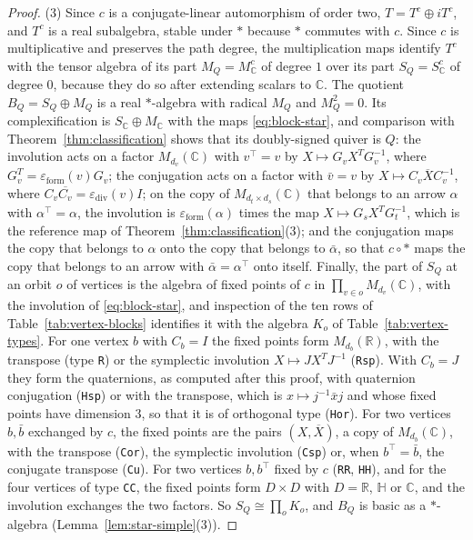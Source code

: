\documentclass[12pt, a4paper]{report}
\theoremstyle{plain}
\theoremstyle{definition}
\theoremstyle{remark}
\theoremstyle{plain}
\newcommand{\epsilondiv}{\varepsilon_{\mathrm{div}}}
\newcommand{\epsilonform}{\varepsilon_{\mathrm{form}}}
\newcommand{\RR}{\mathbb{R}}
\newcommand{\CC}{\mathbb{C}}
\newcommand{\HH}{\mathbb{H}}
\begin{document}
\begin{proof}
(3) Since $c$ is a conjugate-linear automorphism of order two, $T=T^c\oplus iT^c$, and $T^c$ is a real subalgebra, stable under $*$ because $*$ commutes with $c$. Since $c$ is multiplicative and preserves the path degree, the multiplication maps identify $T^c$ with the tensor algebra of its part $M_Q=M_\CC^c$ of degree $1$ over its part $S_Q=S_\CC^c$ of degree $0$, because they do so after extending scalars to $\CC$. The quotient $B_Q=S_Q\oplus M_Q$ is a real $*$-algebra with radical $M_Q$ and $M_Q^2=0$. Its complexification is $S_\CC\oplus M_\CC$ with the maps \eqref{eq:block-star}, and comparison with Theorem~\ref{thm:classification} shows that its doubly-signed quiver is $Q$: the involution acts on a factor $M_{d_v}(\CC)$ with $v^{\top}=v$ by $X\mapsto G_vX^TG_v^{-1}$, where $G_v^T=\epsilonform(v)G_v$; the conjugation acts on a factor with $\bar v=v$ by $X\mapsto C_v\overline XC_v^{-1}$, where $C_v\overline{C_v}=\epsilondiv(v)I$; on the copy of $M_{d_t\times d_s}(\CC)$ that belongs to an arrow $\alpha$ with $\alpha^{\top}=\alpha$, the involution is $\epsilonform(\alpha)$ times the map $X\mapsto G_sX^TG_t^{-1}$, which is the reference map of Theorem~\ref{thm:classification}(3); and the conjugation maps the copy that belongs to $\alpha$ onto the copy that belongs to $\bar\alpha$, so that $c\circ*$ maps the copy that belongs to an arrow with $\bar\alpha=\alpha^{\top}$ onto itself. Finally, the part of $S_Q$ at an orbit $o$ of vertices is the algebra of fixed points of $c$ in $\prod_{v\in o}M_{d_v}(\CC)$, with the involution of \eqref{eq:block-star}, and inspection of the ten rows of Table~\ref{tab:vertex-blocks} identifies it with the algebra $K_o$ of Table~\ref{tab:vertex-types}. For one vertex $b$ with $C_b=I$ the fixed points form $M_{d_b}(\RR)$, with the transpose (type \texttt{R}) or the symplectic involution $X\mapsto JX^TJ^{-1}$ (\texttt{Rsp}). With $C_b=J$ they form the quaternions, as computed after this proof, with quaternion conjugation (\texttt{Hsp}) or with the transpose, which is $x\mapsto j^{-1}\bar xj$ and whose fixed points have dimension $3$, so that it is of orthogonal type (\texttt{Hor}). For two vertices $b,\bar b$ exchanged by $c$, the fixed points are the pairs $(X,\overline X)$, a copy of $M_{d_b}(\CC)$, with the transpose (\texttt{Cor}), the symplectic involution (\texttt{Csp}) or, when $b^{\top}=\bar b$, the conjugate transpose (\texttt{Cu}). For two vertices $b,b^{\top}$ fixed by $c$ (\texttt{RR}, \texttt{HH}), and for the four vertices of type \texttt{CC}, the fixed points form $D\times D$ with $D=\RR$, $\HH$ or $\CC$, and the involution exchanges the two factors. So $S_Q\cong\prod_oK_o$, and $B_Q$ is basic as a $*$-algebra (Lemma~\ref{lem:star-simple}(3)).
\end{proof}
\end{document}
